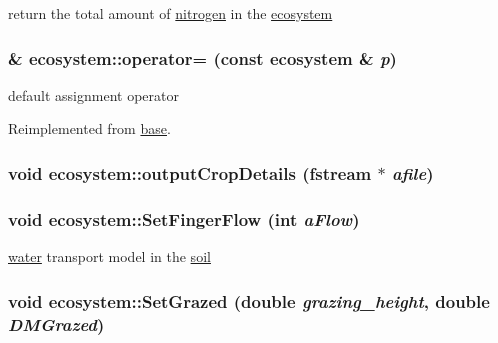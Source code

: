 return the total amount of \hyperlink{classnitrogen}{nitrogen} in the \hyperlink{classecosystem}{ecosystem} \hypertarget{classecosystem_a5970455f5f04fa5382ebc534c3149185}{
\subsubsection[{operator=}]{\& ecosystem::operator= (const {\bf ecosystem} \& {\em p})}}
\label{classecosystem_a5970455f5f04fa5382ebc534c3149185}


default assignment operator 

Reimplemented from \hyperlink{classbase_abd18e2130f975aacfde1833ad137e3c5}{base}.\hypertarget{classecosystem_a86e66b4cea99a0c47c8fef670d4e4a15}{
\subsubsection[{outputCropDetails}]{\setlength{\rightskip}{0pt plus 5cm}void ecosystem::outputCropDetails (fstream $\ast$ {\em afile})}}
\label{classecosystem_a86e66b4cea99a0c47c8fef670d4e4a15}
\hypertarget{classecosystem_a265f6108d61a5607dd0d46f679126fd1}{
\subsubsection[{SetFingerFlow}]{\setlength{\rightskip}{0pt plus 5cm}void ecosystem::SetFingerFlow (int {\em aFlow})}}
\label{classecosystem_a265f6108d61a5607dd0d46f679126fd1}


\hyperlink{classwater}{water} transport model in the \hyperlink{classsoil}{soil} \hypertarget{classecosystem_af86ff12086792509461b7ada09a1572e}{
\subsubsection[{SetGrazed}]{\setlength{\rightskip}{0pt plus 5cm}void ecosystem::SetGrazed (double {\em grazing\_\-height}, \/  double {\em DMGrazed})}}
\label{classecosystem_af86ff12086792509461b7ada09a1572e}


